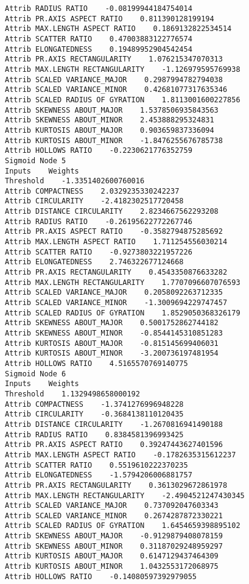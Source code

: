 \documentclass[
	article,			%
	11pt,				%
	oneside,			%
	a4paper,			%
	english,			%
	brazil,				%
	sumario=tradicional
	]{abntex2}
\begin{document}
\begin{lstlisting}
Attrib RADIUS RATIO    -0.08199944184754014
Attrib PR.AXIS ASPECT RATIO    0.811390128199194
Attrib MAX.LENGTH ASPECT RATIO    0.1869132822534514
Attrib SCATTER RATIO    0.47003883122776574
Attrib ELONGATEDNESS    0.19489952904542454
Attrib PR.AXIS RECTANGULARITY    1.076215347070313
Attrib MAX.LENGTH RECTANGULARITY    -1.126979595769938
Attrib SCALED VARIANCE_MAJOR    0.2987994782794038
Attrib SCALED VARIANCE_MINOR    0.42681077317635346
Attrib SCALED RADIUS OF GYRATION    1.8113001600227856
Attrib SKEWNESS ABOUT_MAJOR    1.5378506935843563
Attrib SKEWNESS ABOUT_MINOR    2.453888295324831
Attrib KURTOSIS ABOUT_MAJOR    0.903659837336094
Attrib KURTOSIS ABOUT_MINOR    -1.8476255676785738
Attrib HOLLOWS RATIO    -0.2230621776352759
Sigmoid Node 5
Inputs    Weights
Threshold    -1.3351402600760016
Attrib COMPACTNESS    2.0329235330242237
Attrib CIRCULARITY    -2.4182302517720458
Attrib DISTANCE CIRCULARITY    2.8234667562293208
Attrib RADIUS RATIO    -0.26195622772267746
Attrib PR.AXIS ASPECT RATIO    -0.3582794875285692
Attrib MAX.LENGTH ASPECT RATIO    1.711254556030214
Attrib SCATTER RATIO    -0.9273803221957226
Attrib ELONGATEDNESS    2.746322677124668
Attrib PR.AXIS RECTANGULARITY    0.4543350876633282
Attrib MAX.LENGTH RECTANGULARITY    1.7707096607076593
Attrib SCALED VARIANCE_MAJOR    0.2058092263712335
Attrib SCALED VARIANCE_MINOR    -1.3009694229747457
Attrib SCALED RADIUS OF GYRATION    1.8529050368326179
Attrib SKEWNESS ABOUT_MAJOR    0.5001752862744182
Attrib SKEWNESS ABOUT_MINOR    -0.8544145310851283
Attrib KURTOSIS ABOUT_MAJOR    -0.815145699406031
Attrib KURTOSIS ABOUT_MINOR    -3.200736197481954
Attrib HOLLOWS RATIO    4.5165570769140775
Sigmoid Node 6
Inputs    Weights
Threshold    1.1329498658000192
Attrib COMPACTNESS    -1.3741276996948228
Attrib CIRCULARITY    -0.3684138110120435
Attrib DISTANCE CIRCULARITY    -1.2670816941490188
Attrib RADIUS RATIO    0.8384581396993425
Attrib PR.AXIS ASPECT RATIO    0.39247443627401596
Attrib MAX.LENGTH ASPECT RATIO    -0.1782635315612237
Attrib SCATTER RATIO    0.5519610222370235
Attrib ELONGATEDNESS    -1.5794206006881757
Attrib PR.AXIS RECTANGULARITY    0.3613029672861978
Attrib MAX.LENGTH RECTANGULARITY    -2.4904521247430345
Attrib SCALED VARIANCE_MAJOR    0.737092047603343
Attrib SCALED VARIANCE_MINOR    0.2674287872330221
Attrib SCALED RADIUS OF GYRATION    1.6454659398895102
Attrib SKEWNESS ABOUT_MAJOR    -0.9129879408078159
Attrib SKEWNESS ABOUT_MINOR    0.31187029248959297
Attrib KURTOSIS ABOUT_MAJOR    0.6147129437464309
Attrib KURTOSIS ABOUT_MINOR    1.0432553172068975
Attrib HOLLOWS RATIO    -0.14080597392979055

\end{lstlisting}
\end{document}
